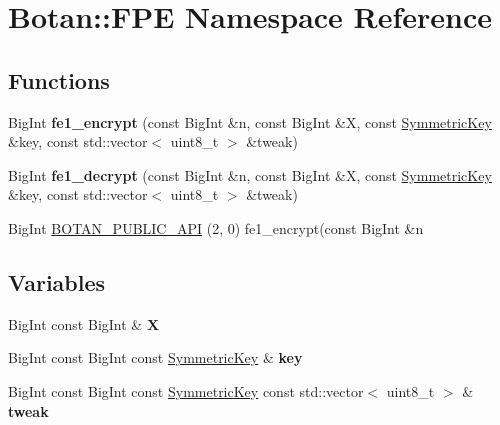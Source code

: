 \hypertarget{namespace_botan_1_1_f_p_e}{}\section{Botan\+:\+:F\+PE Namespace Reference}
\label{namespace_botan_1_1_f_p_e}
\subsection*{Functions}
\begin{DoxyCompactItemize}
\item 
\mbox{\label{namespace_botan_1_1_f_p_e_ab970dbb58ad1ce22681bb8db8932c15b}} 
Big\+Int {\bfseries fe1\+\_\+encrypt} (const Big\+Int \&n, const Big\+Int \&X, const \mbox{\hyperlink{namespace_botan_a89cf6c3513428f524454d01830221a88}{Symmetric\+Key}} \&key, const std\+::vector$<$ uint8\+\_\+t $>$ \&tweak)
\item 
\mbox{\label{namespace_botan_1_1_f_p_e_aa4cc1b361b4f5a1fe1068e61782f342f}} 
Big\+Int {\bfseries fe1\+\_\+decrypt} (const Big\+Int \&n, const Big\+Int \&X, const \mbox{\hyperlink{namespace_botan_a89cf6c3513428f524454d01830221a88}{Symmetric\+Key}} \&key, const std\+::vector$<$ uint8\+\_\+t $>$ \&tweak)
\item 
Big\+Int \mbox{\hyperlink{namespace_botan_1_1_f_p_e_a29bb20fba3a1a40fd254e35b113c17df}{B\+O\+T\+A\+N\+\_\+\+P\+U\+B\+L\+I\+C\+\_\+\+A\+PI}} (2, 0) fe1\+\_\+encrypt(const Big\+Int \&n
\end{DoxyCompactItemize}
\subsection*{Variables}
\begin{DoxyCompactItemize}
\item 
\mbox{\label{namespace_botan_1_1_f_p_e_a2b5c354a6252509808ecb5579215c121}} 
Big\+Int const Big\+Int \& {\bfseries X}
\item 
\mbox{\label{namespace_botan_1_1_f_p_e_a9df28a11971cf39beed323e21763a95b}} 
Big\+Int const Big\+Int const \mbox{\hyperlink{namespace_botan_a89cf6c3513428f524454d01830221a88}{Symmetric\+Key}} \& {\bfseries key}
\item 
\mbox{\label{namespace_botan_1_1_f_p_e_a847fa048d8e934a132e9daf17e589b21}} 
Big\+Int const Big\+Int const \mbox{\hyperlink{namespace_botan_a89cf6c3513428f524454d01830221a88}{Symmetric\+Key}} const std\+::vector$<$ uint8\+\_\+t $>$ \& {\bfseries tweak}
\end{DoxyCompactItemize}


